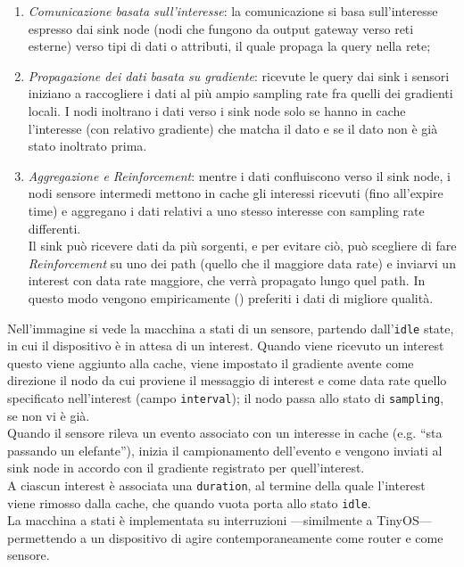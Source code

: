 \begin{enumerate}
\item \emph{Comunicazione basata sull'interesse}: la comunicazione si basa sull'interesse espresso dai sink node (nodi che fungono da output gateway verso reti esterne) verso tipi di dati o attributi, il quale propaga la query nella rete;
\item \emph{Propagazione dei dati basata su gradiente}: ricevute le query dai sink i sensori iniziano a raccogliere i dati al più ampio sampling rate fra quelli dei gradienti locali.
I nodi inoltrano i dati verso i sink node solo se hanno in cache l'interesse (con relativo gradiente) che matcha il dato e se il dato non è già stato inoltrato prima.
\item \emph{Aggregazione e Reinforcement}: mentre i dati confluiscono verso il sink node, i nodi sensore intermedi mettono in cache gli interessi ricevuti (fino all'expire time) e aggregano i dati relativi a uno stesso interesse con sampling rate differenti.\\
Il sink può ricevere dati da più sorgenti, e per evitare ciò, può scegliere di fare \textit{Reinforcement} su uno dei path (quello che il maggiore data rate) e inviarvi un interest con data rate maggiore, che verrà propagato lungo quel path.
In questo modo vengono empiricamente () preferiti i dati di migliore qualità.
\end{enumerate}

Nell'immagine si vede la macchina a stati di un sensore, partendo dall'\texttt{idle} state, in cui il dispositivo è in attesa di un interest.
Quando viene ricevuto un interest questo viene aggiunto alla cache, viene impostato il gradiente avente come direzione il nodo da cui proviene il messaggio di interest e come data rate quello specificato nell'interest (campo \texttt{interval}); il nodo passa allo stato di \texttt{sampling}, se non vi è già.\\
Quando il sensore rileva un evento associato con un interesse in cache (e.g. ``sta passando un elefante''), inizia il campionamento dell'evento e vengono inviati al sink node in accordo con il gradiente registrato per quell'interest.\\
A ciascun interest è associata una \texttt{duration}, al termine della quale l'interest viene rimosso dalla cache, che quando vuota porta allo stato \texttt{idle}.\\
La macchina a stati è implementata su interruzioni ---similmente a TinyOS--- permettendo a un dispositivo di agire contemporaneamente come router e come sensore.

